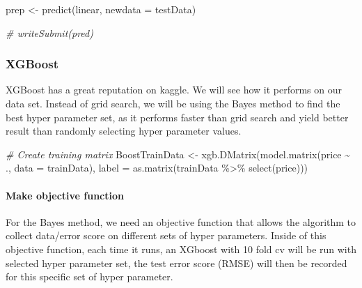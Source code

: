 \documentclass[
]{article}
\newenvironment{Shaded}{\begin{snugshade}}{\end{snugshade}}
\newcommand{\AttributeTok}[1]{\textcolor[rgb]{0.77,0.63,0.00}{#1}}
\newcommand{\CommentTok}[1]{\textcolor[rgb]{0.56,0.35,0.01}{\textit{#1}}}
\newcommand{\FunctionTok}[1]{\textcolor[rgb]{0.00,0.00,0.00}{#1}}
\newcommand{\NormalTok}[1]{#1}
\newcommand{\OtherTok}[1]{\textcolor[rgb]{0.56,0.35,0.01}{#1}}
\newcommand{\SpecialCharTok}[1]{\textcolor[rgb]{0.00,0.00,0.00}{#1}}
\begin{document}
\begin{Shaded}
\begin{Highlighting}[]
\NormalTok{prep }\OtherTok{\textless{}{-}} \FunctionTok{predict}\NormalTok{(linear, }\AttributeTok{newdata =}\NormalTok{ testData)}

\CommentTok{\# writeSubmit(pred)}
\end{Highlighting}
\end{Shaded}

\hypertarget{xgboost}{%
\subsubsection{XGBoost}\label{xgboost}}

XGBoost has a great reputation on kaggle. We will see how it performs on
our data set. Instead of grid search, we will be using the Bayes method
to find the best hyper parameter set, as it performs faster than grid
search and yield better result than randomly selecting hyper parameter
values.

\begin{Shaded}
\begin{Highlighting}[]
\CommentTok{\# Create training matrix }
\NormalTok{BoostTrainData }\OtherTok{\textless{}{-}} \FunctionTok{xgb.DMatrix}\NormalTok{(}\FunctionTok{model.matrix}\NormalTok{(price }\SpecialCharTok{\textasciitilde{}}\NormalTok{ ., }\AttributeTok{data =}\NormalTok{ trainData),}
                              \AttributeTok{label =} \FunctionTok{as.matrix}\NormalTok{(trainData }\SpecialCharTok{\%\textgreater{}\%} \FunctionTok{select}\NormalTok{(price)))}
\end{Highlighting}
\end{Shaded}

\hypertarget{make-objective-function}{%
\paragraph{Make objective function}\label{make-objective-function}}

For the Bayes method, we need an objective function that allows the
algorithm to collect data/error score on different sets of hyper
parameters. Inside of this objective function, each time it runs, an
XGboost with 10 fold cv will be run with selected hyper parameter set,
the test error score (RMSE) will then be recorded for this specific set
of hyper parameter.
\end{document}
